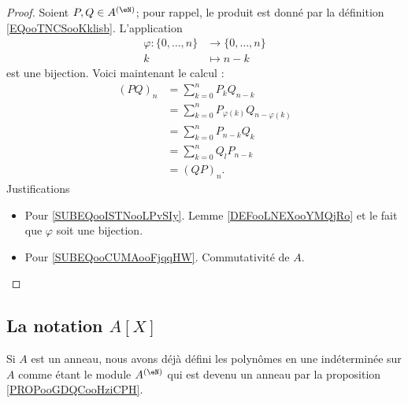\begin{proof}
	Soient \( P,Q\in A^{(\eN)}\); pour rappel, le produit est donné par la définition \ref{EQooTNCSooKklisb}. L'application
	\begin{equation}
		\begin{aligned}
			\varphi\colon \{ 0,\ldots, n \} & \to \{ 0,\ldots, n \} \\
			k                               & \mapsto n-k
		\end{aligned}
	\end{equation}
	est une bijection. Voici maintenant le calcul :
	\begin{subequations}
		\begin{align}
			(PQ)_n & =\sum_{k=0}^nP_kQ_{n-k}                                                    \\
			       & =\sum_{k=0}^nP_{\varphi(k)}Q_{n-\varphi(k)}    \label{SUBEQooISTNooLPvSIy} \\
			       & =\sum_{k=0}^nP_{n-k}Q_{k}                                                  \\
			       & =\sum_{k=0}^nQ_lP_{n-k}      \label{SUBEQooCUMAooFjqqHW}                   \\
			       & =(QP)_n.
		\end{align}
	\end{subequations}
	Justifications
	\begin{itemize}
		\item Pour \eqref{SUBEQooISTNooLPvSIy}. Lemme \ref{DEFooLNEXooYMQjRo} et le fait que \( \varphi\) soit une bijection.
		\item Pour \eqref{SUBEQooCUMAooFjqqHW}. Commutativité de \( A\).
	\end{itemize}
\end{proof}


\subsection{La notation \texorpdfstring{\(  A[X]\)}{A[X]}}
\label{SUBSECooLEKVooFBPSJz}

Si \( A\) est un anneau, nous avons déjà défini les polynômes en une indéterminée sur \( A\) comme étant le module \( A^{(\eN)}\) qui est devenu un anneau par la proposition \ref{PROPooGDQCooHziCPH}.

